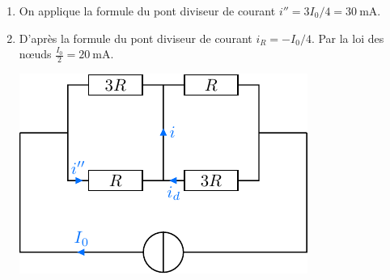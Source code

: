 \documentclass[a4paper, 10pt, garamond, oneside]{book}
\begin{document}
{\begin{enumerate}[resume]
\begin{minipage}{0.6\linewidth}
\begin{center}
			      \end{center}
		      \end{minipage}
		\item On applique la formule du pont diviseur de courant
		      $\boxed{i''=3I_0/4=\SI{30}{\milli\ampere}}$.
		\item \noindent
		      \begin{minipage}{0.4\linewidth}
			      D'après la formule du pont diviseur de courant $i_R=-I_0/4$. Par
			      la loi des nœuds $\boxed{\frac{I_0}{2}=\SI{20}{\milli\ampere}}$.
		      \end{minipage}
		      \begin{minipage}{0.6\linewidth}
			      \begin{center}
		          \includegraphics[width=\linewidth]{diplin_q8}
			      \end{center}
		      \end{minipage}
	\end{enumerate}
}
\end{document}
